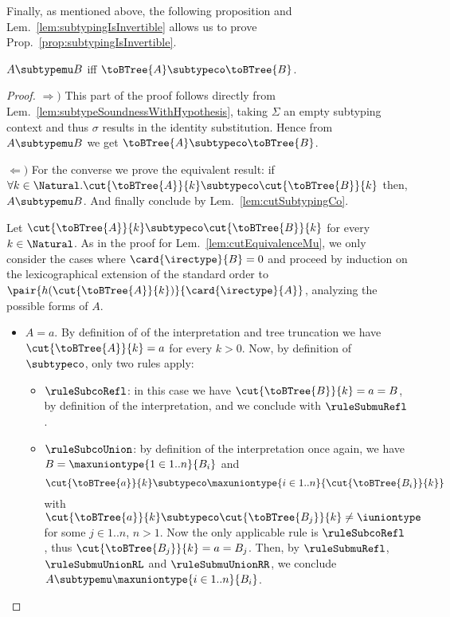 


Finally, as mentioned above, the following proposition and
Lem.~\ref{lem:subtypingIsInvertible} allows us to prove
Prop.~\ref{prop:subtypingIsInvertible}.

\begin{proposition}
\label{prop:subtypeSoundnessAndCompleteness}
$A \subtypemu B$ iff $\toBTree{A} \subtypeco \toBTree{B}$.
\end{proposition}

\begin{proof}
$\Rightarrow)$ This part of the proof follows directly from
Lem.~\ref{lem:subtypeSoundnessWithHypothesis}, taking $\Sigma$ an empty
subtyping context and thus $\sigma$ results in the identity substitution. Hence
from $A \subtypemu B$ we get $\toBTree{A} \subtypeco \toBTree{B}$.

$\Leftarrow)$ For the converse we prove the equivalent result: if $\forall k
\in \Natural.\cut{\toBTree{A}}{k} \subtypeco \cut{\toBTree{B}}{k}$ then, $A
\subtypemu B$. And finally conclude by Lem.~\ref{lem:cutSubtypingCo}.

Let $\cut{\toBTree{A}}{k} \subtypeco \cut{\toBTree{B}}{k}$ for every $k \in
\Natural$. As in the proof for Lem.~\ref{lem:cutEquivalenceMu}, we only
consider the cases where $\card{\irectype}{B} = 0$ and proceed by induction on
the lexicographical extension of the standard order to
$\pair{h(\cut{\toBTree{A}}{k})}{\card{\irectype}{A}}$, analyzing the possible
forms of $A$.\
\begin{itemize}
  \item $A = a$. By definition of of the interpretation and tree truncation we
  have $\cut{\toBTree{A}}{k} = a$ for every $k > 0$. Now, by definition of
  $\subtypeco$, only two rules apply:
  \begin{itemize}
    \item $\ruleSubcoRefl$: in this case we have $\cut{\toBTree{B}}{k} = a =
    B$, by definition of the interpretation, and we conclude with
    $\ruleSubmuRefl$.
    
    \item $\ruleSubcoUnion$: by definition of the interpretation once again, we
    have $B = \maxuniontype{1 \in 1..n}{B_i}$ and $$\cut{\toBTree{a}}{k}
    \subtypeco \maxuniontype{i \in 1..n}{\cut{\toBTree{B_i}}{k}}$$ with
    $\cut{\toBTree{a}}{k} \subtypeco \cut{\toBTree{B_j}}{k} \neq \iuniontype$
    for some $j \in 1..n$, $n > 1$. Now the only applicable rule is
    $\ruleSubcoRefl$, thus $\cut{\toBTree{B_j}}{k} = a = B_j$. Then, by
    $\ruleSubmuRefl$, $\ruleSubmuUnionRL$ and $\ruleSubmuUnionRR$, we conclude
    $A \subtypemu \maxuniontype{i \in 1..n}{B_i}$.
  \end{itemize}
  

\end{itemize}
\end{proof}
